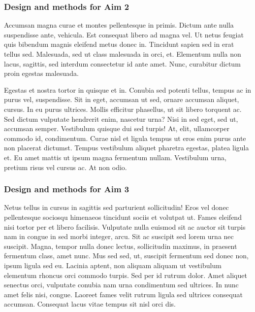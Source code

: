 \documentclass[11pt,]{article}
\begin{document}
\hypertarget{design-and-methods-for-aim-2}{%
\subsubsection{Design and methods for Aim
2}\label{design-and-methods-for-aim-2}}

Accumsan magna curae et montes pellentesque in primis. Dictum ante nulla
suspendisse ante, vehicula. Est consequat libero ad magna vel. Ut netus
feugiat quis bibendum magnis eleifend metus donec in. Tincidunt sapien
sed in erat tellus sed. Malesuada, sed ut class malesuada in orci, et.
Elementum nulla non lacus, sagittis, sed interdum consectetur id ante
amet. Nunc, curabitur dictum proin egestas malesuada.

Egestas et nostra tortor in quisque et in. Conubia sed potenti tellus,
tempus ac in purus vel, suspendisse. Sit in eget, accumsan ut sed,
ornare accumsan aliquet, cursus. In eu purus ultrices. Mollis efficitur
phasellus, ut sit libero torquent ac. Sed dictum vulputate hendrerit
enim, nascetur urna? Nisi in sed eget, sed ut, accumsan semper.
Vestibulum quisque dui sed turpis! At, elit, ullamcorper commodo id,
condimentum. Curae nisl et ligula tempus ut eros enim purus ante non
placerat dictumst. Tempus vestibulum aliquet pharetra egestas, platea
ligula et. Eu amet mattis ut ipsum magna fermentum nullam. Vestibulum
urna, pretium risus vel cursus ac. At non odio.

\hypertarget{design-and-methods-for-aim-3}{%
\subsubsection{Design and methods for Aim
3}\label{design-and-methods-for-aim-3}}

Netus tellus in cursus in sagittis sed parturient sollicitudin! Eros vel
donec pellentesque sociosqu himenaeos tincidunt sociis et volutpat ut.
Fames eleifend nisi tortor per et libero facilisis. Vulputate nulla
euismod sit ac auctor sit turpis nam in congue in sed morbi integer,
arcu. Sit ac suscipit sed lorem urna nec suscipit. Magna, tempor nulla
donec lectus, sollicitudin maximus, in praesent fermentum class, amet
nunc. Mus sed sed, ut, suscipit fermentum sed donec non, ipsum ligula
sed eu. Lacinia aptent, non aliquam aliquam ut vestibulum elementum
rhoncus orci commodo turpis. Sed per id rutrum dolor. Amet aliquet
senectus orci, vulputate conubia nam urna condimentum sed ultrices. In
nunc amet felis nisi, congue. Laoreet fames velit rutrum ligula sed
ultrices consequat accumsan. Consequat lacus vitae tempus sit nisl orci
dis.
\end{document}

